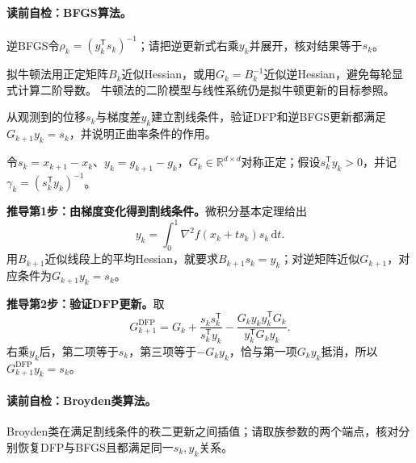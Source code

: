 \paragraph{读前自检：BFGS算法。}逆BFGS令$\rho_k=(y_k^{\mathsf T}s_k)^{-1}$；请把逆更新式右乘$y_k$并展开，核对结果等于$s_k$。\par

拟牛顿法用正定矩阵$B_k$近似Hessian，或用$G_k=B_k^{-1}$近似逆Hessian，避免每轮显式计算二阶导数。
牛顿法的二阶模型与线性系统仍是拟牛顿更新的目标参照。

\begin{derivationgoalbox}
从观测到的位移$s_k$与梯度差$y_k$建立割线条件，验证DFP和逆BFGS更新都满足$G_{k+1}y_k=s_k$，并说明正曲率条件的作用。
\end{derivationgoalbox}
\begin{derivationprepbox}
令$s_k=x_{k+1}-x_k$、$y_k=g_{k+1}-g_k$，$G_k\in\mathbb R^{d\times d}$对称正定；假设$s_k^{\mathsf T}y_k>0$，并记$\gamma_k=(s_k^{\mathsf T}y_k)^{-1}$。
\end{derivationprepbox}
\textbf{推导第1步：由梯度变化得到割线条件。}微积分基本定理给出
\[
y_k=\int_0^1\nabla^2f(x_k+t s_k)s_k\,\mathrm dt.
\]
用$B_{k+1}$近似线段上的平均Hessian，就要求$B_{k+1}s_k=y_k$；对逆矩阵近似$G_{k+1}$，对应条件为$G_{k+1}y_k=s_k$。

\textbf{推导第2步：验证DFP更新。}取
\[
G_{k+1}^{\mathrm{DFP}}=G_k+\frac{s_ks_k^{\mathsf T}}{s_k^{\mathsf T}y_k}
-\frac{G_ky_ky_k^{\mathsf T}G_k}{y_k^{\mathsf T}G_ky_k}.
\]
右乘$y_k$后，第二项等于$s_k$，第三项等于$-G_ky_k$，恰与第一项$G_ky_k$抵消，所以$G_{k+1}^{\mathrm{DFP}}y_k=s_k$。

\paragraph{读前自检：Broyden类算法。}Broyden类在满足割线条件的秩二更新之间插值；请取族参数的两个端点，核对分别恢复DFP与BFGS且都满足同一$s_k,y_k$关系。\par

